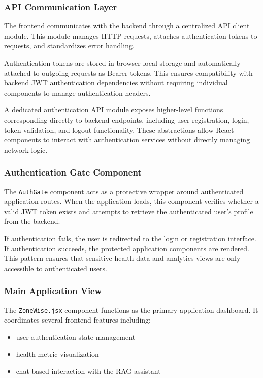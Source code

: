 \documentclass[11pt,twocolumn]{article}
\begin{document}
\subsubsection{API Communication Layer}

The frontend communicates with the backend through a centralized API client module. This module manages HTTP requests, attaches authentication tokens to requests, and standardizes error handling. 

Authentication tokens are stored in browser local storage and automatically attached to outgoing requests as Bearer tokens. This ensures compatibility with backend JWT authentication dependencies without requiring individual components to manage authentication headers.

A dedicated authentication API module exposes higher-level functions corresponding directly to backend endpoints, including user registration, login, token validation, and logout functionality. These abstractions allow React components to interact with authentication services without directly managing network logic.

\subsubsection{Authentication Gate Component}

The \texttt{AuthGate} component acts as a protective wrapper around authenticated application routes. When the application loads, this component verifies whether a valid JWT token exists and attempts to retrieve the authenticated user's profile from the backend.

If authentication fails, the user is redirected to the login or registration interface. If authentication succeeds, the protected application components are rendered. This pattern ensures that sensitive health data and analytics views are only accessible to authenticated users.

\subsubsection{Main Application View}

The \texttt{ZoneWise.jsx} component functions as the primary application dashboard. It coordinates several frontend features including:

\begin{itemize}
\item user authentication state management
\item health metric visualization
\item chat-based interaction with the RAG assistant
\end{itemize}
\end{document}
